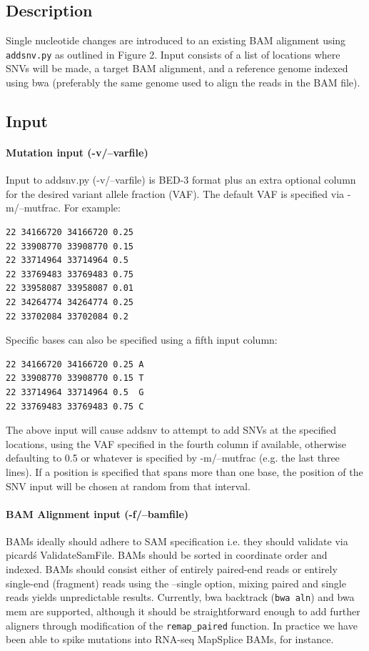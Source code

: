 \documentclass[letterpaper,11pt]{article}
\begin{document}
\subsection{Description}
    Single nucleotide changes are introduced to an existing BAM alignment using \texttt {addsnv.py} as outlined in Figure 2. Input consists of a list of locations where SNVs will be made, a target BAM alignment, and a reference genome indexed using bwa (preferably the same genome used to align the reads in the BAM file). 

\subsection{Input}
\paragraph{Mutation input (-v/--varfile)}
	Input to addsnv.py (-v/--varfile) is BED-3 format plus an extra optional column for the desired variant allele fraction (VAF). The default VAF is specified via -m/--mutfrac. For example:
\begin{verbatim}
22 34166720 34166720 0.25
22 33908770 33908770 0.15
22 33714964 33714964 0.5
22 33769483 33769483 0.75
22 33958087 33958087 0.01
22 34264774 34264774 0.25
22 33702084 33702084 0.2
\end{verbatim}

Specific bases can also be specified using a fifth input column:
\begin{verbatim}
22 34166720 34166720 0.25 A
22 33908770 33908770 0.15 T
22 33714964 33714964 0.5  G
22 33769483 33769483 0.75 C
\end{verbatim}

    The above input will cause addsnv to attempt to add SNVs at the specified locations, using the VAF specified in the fourth column if available, otherwise defaulting to 0.5 or whatever is specified by -m/--mutfrac (e.g. the last three lines). If a position is specified that spans more than one base, the position of the SNV input will be chosen at random from that interval.

\paragraph{BAM Alignment input (-f/--bamfile)}
	BAMs ideally should adhere to SAM specification i.e. they should validate via picard\'s ValidateSamFile. BAMs should be sorted in coordinate order and indexed. BAMs should consist either of entirely paired-end reads or entirely single-end (fragment) reads using the --single option, mixing paired and single reads yields unpredictable results. Currently, bwa backtrack (\texttt{bwa aln}) and bwa mem are supported, although it should be straightforward enough to add further aligners through modification of the \texttt{remap\_paired} function. In practice we have been able to spike mutations into RNA-seq MapSplice BAMs, for instance.
\end{document}
